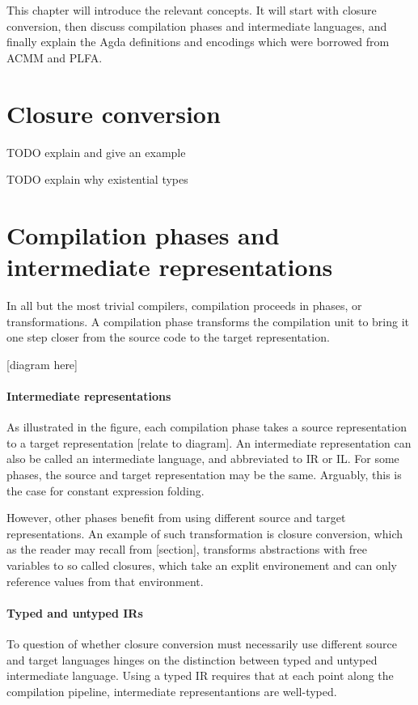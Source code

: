 \documentclass[bsc,frontabs,oneside,singlespacing,parskip,deptreport]{infthesis}
\theoremstyle{definition}
\theoremstyle{lemma}
\begin{document}
This chapter will introduce the relevant concepts. It will start with
closure conversion, then discuss compilation phases and intermediate
languages, and finally explain the Agda definitions and encodings
which were borrowed from ACMM and PLFA.

\section{Closure conversion}

TODO explain and give an example

TODO explain why existential types

\section{Compilation phases and intermediate representations}

In all but the most trivial compilers, compilation proceeds in
phases, or transformations. A compilation phase transforms the
compilation unit to bring it one step closer from the source code to
the target representation.

[diagram here]

\paragraph{Intermediate representations} As illustrated in the figure,
each compilation phase takes a source representation to a target
representation [relate to diagram]. An intermediate representation can
also be called an intermediate language, and abbreviated to IR or
IL. For some phases, the source and target representation may be the
same. Arguably, this is the case for constant expression folding.

However, other phases benefit from using different source and target
representations. An example of such transformation is closure
conversion, which as the reader may recall from [section], transforms
abstractions with free variables to so called closures, which take an
explit environement and can only reference values from that
environment.

\paragraph{Typed and untyped IRs} To question of whether closure
conversion must necessarily use different source and target languages
hinges on the distinction between typed and untyped intermediate
language. Using a typed IR requires that at each point along the
compilation pipeline, intermediate representantions are well-typed.
\end{document}
